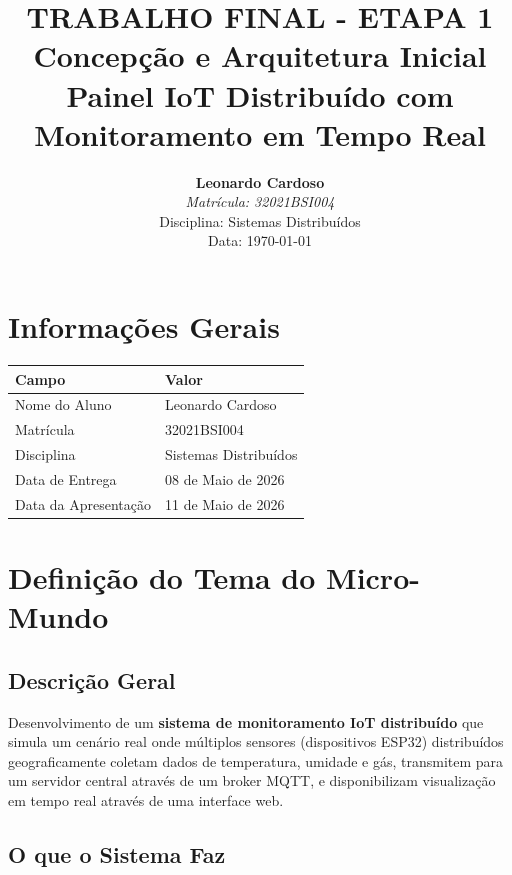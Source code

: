 \documentclass[12pt,a4paper,oneside]{report}
\title{
    \vspace{-1.5cm}
    {\Large \textbf{TRABALHO FINAL - ETAPA 1}}\\
    \vspace{0.5cm}
    {\LARGE \textbf{Concepção e Arquitetura Inicial}}\\
    \vspace{1cm}
    {\Large Painel IoT Distribuído com Monitoramento em Tempo Real}\\
    \vspace{1.5cm}
}
\author{
    \textbf{Leonardo Cardoso}\\
    \textit{Matrícula: 32021BSI004}\\
    \vspace{0.5cm}
    Disciplina: Sistemas Distribuídos\\
    Data: \today
}
\date{}
\begin{document}
\maketitle

\newpage
\tableofcontents
\newpage

\chapter{Informações Gerais}

\begin{center}
\begin{tabular}{|l|l|}
    \hline
    \rowcolor{lightblue}
    \textbf{Campo} & \textbf{Valor} \\
    \hline
    Nome do Aluno & Leonardo Cardoso \\
    \hline
    Matrícula & 32021BSI004 \\
    \hline
    Disciplina & Sistemas Distribuídos \\
    \hline
    Data de Entrega & 08 de Maio de 2026 \\
    \hline
    Data da Apresentação & 11 de Maio de 2026 \\
    \hline
\end{tabular}
\end{center}

\chapter{Definição do Tema do Micro-Mundo}

\section{Descrição Geral}

Desenvolvimento de um \textbf{sistema de monitoramento IoT distribuído} que simula um cenário real onde múltiplos sensores (dispositivos ESP32) distribuídos geograficamente coletam dados de temperatura, umidade e gás, transmitem para um servidor central através de um broker MQTT, e disponibilizam visualização em tempo real através de uma interface web.

\section{O que o Sistema Faz}
\end{document}
